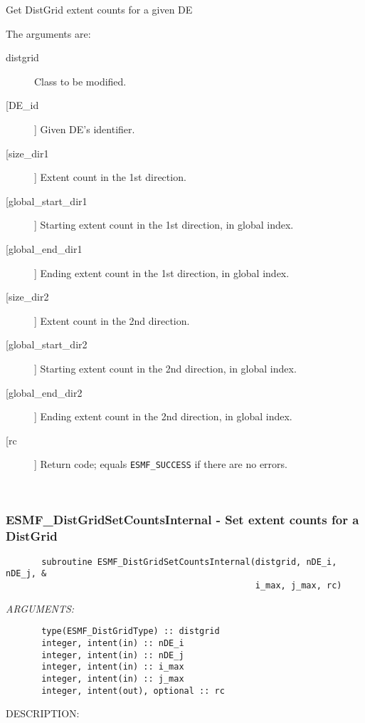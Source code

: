        Get DistGrid extent counts for a given DE
  
       The arguments are:
       \begin{description}
       \item[distgrid] 
            Class to be modified.
       \item[[DE\_id]]
            Given DE's identifier.
       \item[[size\_dir1]]
            Extent count in the 1st direction.
       \item[[global\_start\_dir1]]
            Starting extent count in the 1st direction, in global index.
       \item[[global\_end\_dir1]]
            Ending extent count in the 1st direction, in global index.
       \item[[size\_dir2]]
            Extent count in the 2nd direction.
       \item[[global\_start\_dir2]]
            Starting extent count in the 2nd direction, in global index.
       \item[[global\_end\_dir2]]
            Ending extent count in the 2nd direction, in global index.
       \item[[rc]] 
            Return code; equals {\tt ESMF\_SUCCESS} if there are no errors.
       \end{description}
   
 
\mbox{}\hrulefill\ 
 
\subsubsection{ESMF\_DistGridSetCountsInternal - Set extent counts for a DistGrid}


 
\begin{verbatim}       subroutine ESMF_DistGridSetCountsInternal(distgrid, nDE_i, nDE_j, &
                                                 i_max, j_max, rc)\end{verbatim}{\em ARGUMENTS:}
\begin{verbatim}       type(ESMF_DistGridType) :: distgrid
       integer, intent(in) :: nDE_i
       integer, intent(in) :: nDE_j
       integer, intent(in) :: i_max
       integer, intent(in) :: j_max
       integer, intent(out), optional :: rc            
 \end{verbatim}
{\sf DESCRIPTION:\\ }


